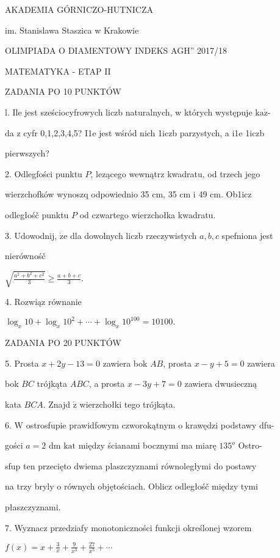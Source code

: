 \documentclass[a4paper,12pt]{article}
\begin{document}
AKADEMIA GÓRNICZO-HUTNICZA

im. Stanislawa Staszica w Krakowie

OLIMPIADA O DIAMENTOWY INDEKS AGH'' 2017/18

MATEMATYKA - ETAP II

ZADANIA PO 10 PUNKTÓW

l. Ile jest sześciocyfrowych liczb naturalnych, w których występuje $\mathrm{k}\mathrm{a}\dot{\mathrm{z}}$-

da z cyfr 0,1,2,3,4,5? I1e jest wśród nich 1iczb parzystych, a i1e 1iczb

pierwszych?

2. Odlegfości punktu $P$, lezącego wewnątrz kwadratu, od trzech jego

wierzchofków wynoszq odpowiednio 35 cm, 35 cm i 49 cm. Ob1icz

odległośč punktu $P$ od czwartego wierzchołka kwadratu.

3. Udowodnij, $\dot{\mathrm{z}}\mathrm{e}$ dla dowolnych liczb rzeczywistych $a, b, c$ spefniona jest

nierównośč

$\displaystyle \sqrt{\frac{a^{2}+b^{2}+c^{2}}{3}}\geq\frac{a+b+c}{3}.$

4. Rozwiąz równanie

$\log_{x}10+\log_{x}10^{2}+\cdots+\log_{x}10^{100}=10100.$

ZADANIA PO 20 PUNKTÓW

5. Prosta $x+2y-13=0$ zawiera bok $AB$, prosta $x-y+5=0$ zawiera

bok $BC$ trójkąta $ABC$, a prosta $x-3y+7=0$ zawiera dwusieczną

kata $BCA.$ Znajd $\acute{\mathrm{z}}$ wierzchołki tego trójkąta.

6. $\mathrm{W}$ ostrosfupie prawidfowym czworokątnym o krawędzi podstawy dfu-

gości $a=2$ dm $\mathrm{k}\mathrm{a}\mathrm{t}$ między ścianami bocznymi ma miarę $135^{o}$ Ostro-

sfup ten przecięto dwiema plaszczyznami równoległymi do postawy

na trzy bryly o równych objętościach. Oblicz odległośč między tymi

płaszczyznami.

7. Wyznacz przedziafy monotoniczności funkcji określonej wzorem

$ f(x)=x+\displaystyle \frac{3}{x}+\frac{9}{x^{3}}+\frac{27}{x^{5}}+\cdots$
\end{document}
